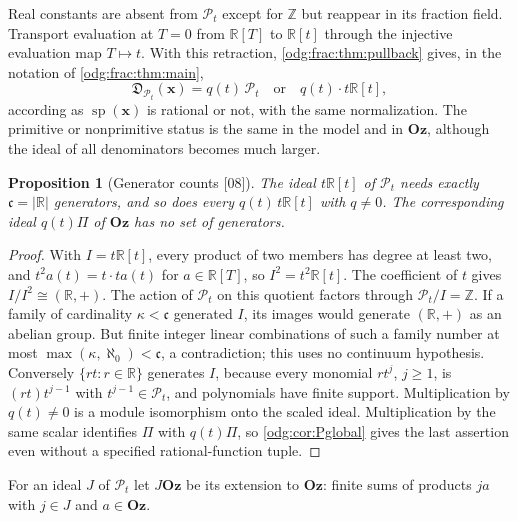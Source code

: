 \documentclass[11pt,oneside]{article}
\numberwithin{equation}{section}
\newtheorem{proposition}[proposition]{Proposition}
\theoremstyle{definition}
\theoremstyle{remark}
\newcommand{\Oz}{\mathbf{Oz}}
\newcommand{\Z}{\mathbb Z}
\newcommand{\R}{\mathbb R}
\newcommand{\src}[1]{\textup{\textsf{\small[#1]}}}
\newcommand{\Den}{\mathfrak D}
\newcommand{\spz}{\operatorname{sp}}
\newcommand{\Pmod}{\mathcal P}
\begin{document}
Real constants are absent from $\Pmod_t$ except for $\Z$ but reappear in its
fraction field. Transport evaluation at $T=0$ from $\R[T]$ to $\R[t]$
through the injective evaluation map $T\mapsto t$. With this retraction,
\cref{odg:frac:thm:pullback} gives, in the notation of \cref{odg:frac:thm:main},
\begin{equation}\label{odg:frac:eq:modelden}
 \Den_{\Pmod_t}(\mathbf x)=q(t)\,\Pmod_t\quad\text{or}\quad q(t)\cdot t\R[t],
\end{equation}
according as $\spz(\mathbf x)$ is rational or not, with the same normalization.
The primitive or nonprimitive status is the same in the model and in $\Oz$,
although the ideal of all denominators becomes much larger.

\begin{proposition}[Generator counts \src{08}]\label{odg:frac:prop:generators}
The ideal $t\R[t]$ of $\Pmod_t$ needs exactly $\mathfrak c=|\R|$ generators, and so
does every $q(t)\,t\R[t]$ with $q\ne0$. The corresponding ideal $q(t)\Pi$ of $\Oz$
has no set of generators.
\end{proposition}
\begin{proof}
With $I=t\R[t]$, every product of two members has degree at least two,
and $t^2a(t)=t\cdot ta(t)$ for $a\in\R[T]$, so $I^2=t^2\R[t]$.
The coefficient of $t$ gives $I/I^2\cong(\R,+)$. The action of
$\Pmod_t$ on this quotient factors through $\Pmod_t/I=\Z$.
If a family of cardinality $\kappa<\mathfrak c$ generated $I$, its
images would generate $(\R,+)$ as an abelian group. But finite integer
linear combinations of such a family number at most
$\max(\kappa,\aleph_0)<\mathfrak c$, a contradiction; this uses no
continuum hypothesis. Conversely $\{rt:r\in\R\}$ generates $I$, because
every monomial $rt^j$, $j\ge1$, is $(rt)t^{j-1}$ with
$t^{j-1}\in\Pmod_t$, and polynomials have finite support.
Multiplication by $q(t)\ne0$ is a module isomorphism onto the scaled
ideal. Multiplication by the same scalar identifies $\Pi$ with $q(t)\Pi$,
so \cref{odg:cor:Pglobal} gives the last assertion even without a specified
rational-function tuple.
\end{proof}

For an ideal $J$ of $\Pmod_t$ let $J\Oz$ be its extension to $\Oz$:
finite sums of products $ja$ with $j\in J$ and $a\in\Oz$.
\end{document}
